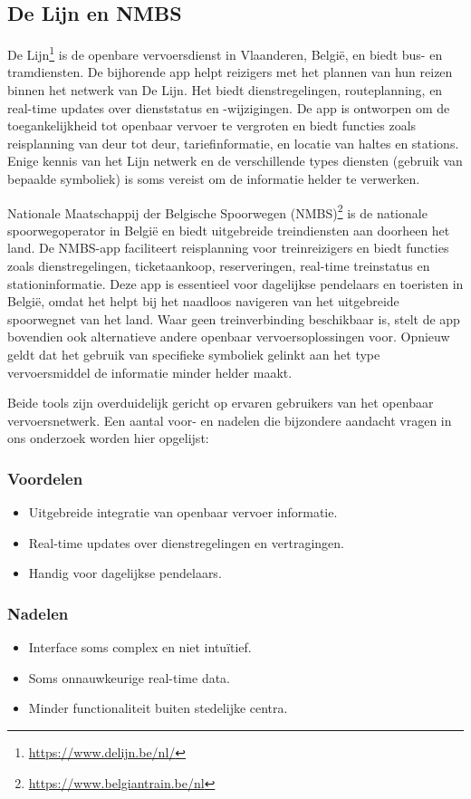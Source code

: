 \subsection{De Lijn en NMBS}
De Lijn\footnote{\url{https://www.delijn.be/nl/}} is de openbare vervoersdienst in Vlaanderen, België, en biedt bus- en tramdiensten. De bijhorende app helpt reizigers met het plannen van hun reizen binnen het netwerk van De Lijn. Het biedt dienstregelingen, routeplanning, en real-time updates over dienststatus en -wijzigingen. De app is ontworpen om de toegankelijkheid tot openbaar vervoer te vergroten en biedt functies zoals reisplanning van deur tot deur, tariefinformatie, en locatie van haltes en stations. Enige kennis van het Lijn netwerk en de verschillende types diensten (gebruik van bepaalde symboliek) is soms vereist om de informatie helder te verwerken.

Nationale Maatschappij der Belgische Spoorwegen (NMBS)\footnote{\url{https://www.belgiantrain.be/nl}} is de nationale spoorwegoperator in België en biedt uitgebreide treindiensten aan doorheen het land. De NMBS-app faciliteert reisplanning voor treinreizigers en biedt functies zoals dienstregelingen, ticketaankoop, reserveringen, real-time treinstatus en stationinformatie. Deze app is essentieel voor dagelijkse pendelaars en toeristen in België, omdat het helpt bij het naadloos navigeren van het uitgebreide spoorwegnet van het land. Waar geen treinverbinding beschikbaar is, stelt de app bovendien ook alternatieve andere openbaar vervoersoplossingen voor. Opnieuw geldt dat het gebruik van specifieke symboliek gelinkt aan het type vervoersmiddel de informatie minder helder maakt.

Beide tools zijn overduidelijk gericht op ervaren gebruikers van het openbaar vervoersnetwerk. Een aantal voor- en nadelen die bijzondere aandacht vragen in ons onderzoek worden hier opgelijst:

\subsubsection*{Voordelen}
\begin{itemize}
    \item Uitgebreide integratie van openbaar vervoer informatie.
    \item Real-time updates over dienstregelingen en vertragingen.
    \item Handig voor dagelijkse pendelaars.
\end{itemize}
\subsubsection*{Nadelen}
\begin{itemize}
    \item Interface soms complex en niet intuïtief.
    \item Soms onnauwkeurige real-time data.
    \item Minder functionaliteit buiten stedelijke centra.
\end{itemize}

